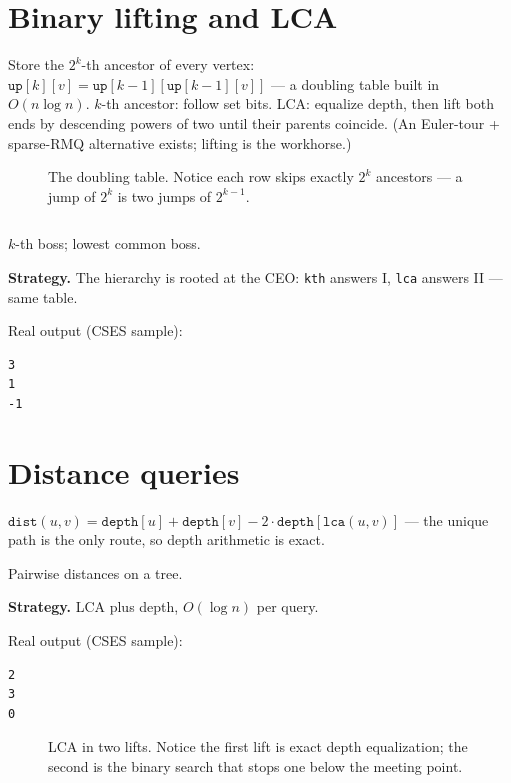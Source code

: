 \section{Binary lifting and LCA}\label{sec:lca}
Store the $2^k$-th ancestor of every vertex: $\texttt{up}[k][v] =
\texttt{up}[k{-}1][\texttt{up}[k{-}1][v]]$ --- a doubling table built
in $O(n\log n)$. $k$-th ancestor: follow set bits. LCA: equalize
depth, then lift both ends by descending powers of two until their
parents coincide. (An Euler-tour + sparse-RMQ alternative exists;
lifting is the workhorse.)
\begin{figure}[ht]\centering

\caption{The doubling table. Notice each row skips exactly $2^k$
ancestors --- a jump of $2^k$ is two jumps of $2^{k-1}$.}
\label{fig:binlift}
\end{figure}
\begin{lstlisting}[language=C++,caption={\texttt{lca.h}: lifting
table, \texttt{kth}, \texttt{lca}, \texttt{dist}.},label={lst:lca}]
\end{lstlisting}

\begin{example}\label{ex:comp}
$k$-th boss; lowest common boss.
\par\smallskip
\textbf{Strategy.} The hierarchy is rooted at the CEO: \texttt{kth}
answers I, \texttt{lca} answers II --- same table.
\par\smallskip
\begin{solution}

Real output (CSES sample):
\begin{lstlisting}[numbers=none]
3
1
-1
\end{lstlisting}
\end{solution}
\end{example}

\section{Distance queries}\label{sec:distq}
$\texttt{dist}(u,v) = \texttt{depth}[u] + \texttt{depth}[v] -
2\cdot\texttt{depth}[\texttt{lca}(u,v)]$ --- the unique path is the
only route, so depth arithmetic is exact.
\begin{example}\label{ex:distq}
Pairwise distances on a tree.
\par\smallskip
\textbf{Strategy.} LCA plus depth, $O(\log n)$ per query.
\par\smallskip
\begin{solution}

Real output (CSES sample):
\begin{lstlisting}[numbers=none]
2
3
0
\end{lstlisting}
\end{solution}
\end{example}
\begin{figure}[ht]\centering

\caption{LCA in two lifts. Notice the first lift is exact depth
equalization; the second is the binary search that stops one below
the meeting point.}
\label{fig:lca}
\end{figure}

